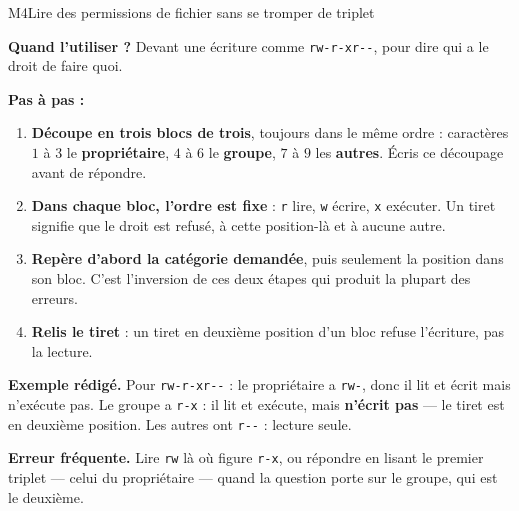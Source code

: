 \begin{fichemethode}{M4}{Lire des permissions de fichier sans se tromper de triplet}

\textbf{Quand l'utiliser ?} Devant une écriture comme \lstinline{rw-r-xr--}, pour dire qui a le
droit de faire quoi.

\textbf{Pas à pas :}
\begin{enumerate}
  \item \textbf{Découpe en trois blocs de trois}, toujours dans le même ordre :
        caractères $1$ à $3$ le \textbf{propriétaire}, $4$ à $6$ le \textbf{groupe},
        $7$ à $9$ les \textbf{autres}. Écris ce découpage avant de répondre.
  \item \textbf{Dans chaque bloc, l'ordre est fixe} : \lstinline{r} lire, \lstinline{w} écrire,
        \lstinline{x} exécuter. Un tiret signifie que le droit est refusé, à cette position-là
        et à aucune autre.
  \item \textbf{Repère d'abord la catégorie demandée}, puis seulement la position dans son
        bloc. C'est l'inversion de ces deux étapes qui produit la plupart des erreurs.
  \item \textbf{Relis le tiret} : un tiret en deuxième position d'un bloc refuse l'écriture,
        pas la lecture.
\end{enumerate}

\textbf{Exemple rédigé.} Pour \lstinline{rw-r-xr--} : le propriétaire a \lstinline{rw-}, donc
il lit et écrit mais n'exécute pas. Le groupe a \lstinline{r-x} : il lit et exécute, mais
\textbf{n'écrit pas} — le tiret est en deuxième position. Les autres ont \lstinline{r--} :
lecture seule.

\textbf{Erreur fréquente.} Lire \lstinline{rw} là où figure \lstinline{r-x}, ou répondre en
lisant le premier triplet — celui du propriétaire — quand la question porte sur le groupe, qui
est le deuxième.

\end{fichemethode}
